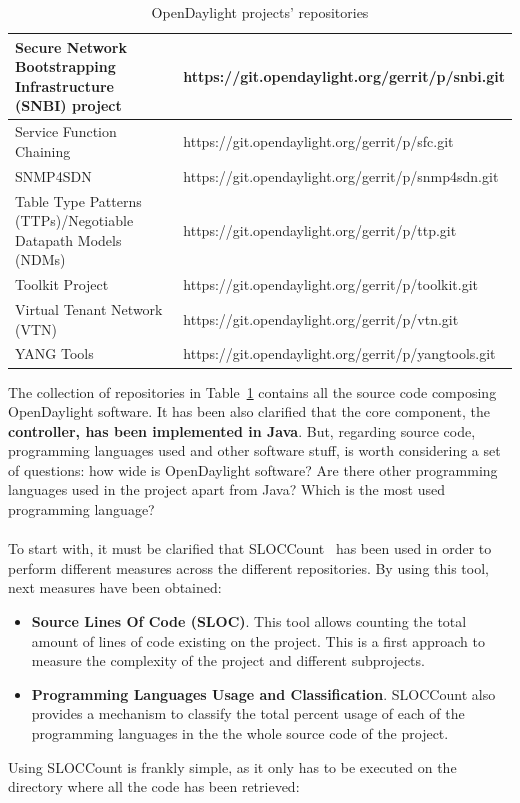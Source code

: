 \documentclass[a4paper, 12pt]{book}
\begin{document}
\begin{table}
\begin{center}
\begin{tabular}{|p{6cm}|l|}
Secure Network Bootstrapping Infrastructure (SNBI) project & https://git.opendaylight.org/gerrit/p/snbi.git \\ \hline
Service Function Chaining & https://git.opendaylight.org/gerrit/p/sfc.git \\ \hline
SNMP4SDN  & https://git.opendaylight.org/gerrit/p/snmp4sdn.git \\ \hline
Table Type Patterns (TTPs)/Negotiable Datapath Models (NDMs) & https://git.opendaylight.org/gerrit/p/ttp.git \\ \hline
Toolkit Project & https://git.opendaylight.org/gerrit/p/toolkit.git \\ \hline
Virtual Tenant Network (VTN) & https://git.opendaylight.org/gerrit/p/vtn.git \\ \hline
YANG Tools & https://git.opendaylight.org/gerrit/p/yangtools.git \\ \hline
\end{tabular}
\end{center}
\caption{OpenDaylight projects' repositories}
\label{tab:projectgitrepos}
\end{table}
The collection of repositories in Table~\ref{tab:projectgitrepos} contains all the source code composing OpenDaylight software. It has been also clarified that the core component, the \textbf{controller, has been implemented in Java}. But, regarding source code, programming languages used and other software stuff, is worth considering a set of questions: how wide is OpenDaylight software? Are there other programming languages used in the project apart from Java? Which is the most used programming language?\\
\\
To start with, it must be clarified that SLOCCount~\cite{SLOCCount} has been used in order to perform different measures across the different repositories. By using this tool, next measures have been obtained:
\begin{itemize}\itemsep0pt
\item{\textbf{Source Lines Of Code (SLOC)}}. This tool allows counting the total amount of lines of code existing on the project. This is a first approach to measure the complexity of the project and different subprojects.
\item{\textbf{Programming Languages Usage and Classification}}. SLOCCount also provides a mechanism to classify the total percent usage of each of the programming languages in the the whole source code of the project.
\end{itemize}
Using SLOCCount is frankly simple, as it only has to be executed on the directory where all the code has been retrieved:
\end{document}
